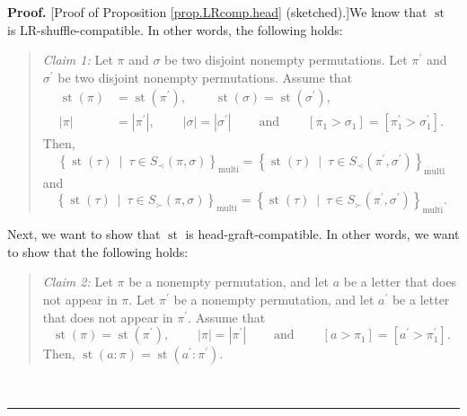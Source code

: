 \documentclass[numbers=enddot,12pt,final,onecolumn,notitlepage]{scrartcl}%
\theoremstyle{definition}
\newenvironment{statement}{\begin{quote}}{\end{quote}}
\newenvironment{proof}[1][Proof]{\noindent\textbf{#1.} }{\ \rule{0.5em}{0.5em}}
\begin{document}
\begin{proof}
[Proof of Proposition \ref{prop.LRcomp.head} (sketched).]We know that
$\operatorname*{st}$ is LR-shuffle-compatible. In other words, the following holds:

\begin{statement}
\textit{Claim 1:} Let $\pi$ and $\sigma$ be two disjoint nonempty
permutations. Let $\pi^{\prime}$ and $\sigma^{\prime}$ be two disjoint
nonempty permutations. Assume that%
\begin{align*}
\operatorname*{st}\left(  \pi\right)   &  =\operatorname*{st}\left(
\pi^{\prime}\right)  ,\ \ \ \ \ \ \ \ \ \ \operatorname*{st}\left(
\sigma\right)  =\operatorname*{st}\left(  \sigma^{\prime}\right)  ,\\
\left\vert \pi\right\vert  &  =\left\vert \pi^{\prime}\right\vert
,\ \ \ \ \ \ \ \ \ \ \left\vert \sigma\right\vert =\left\vert \sigma^{\prime
}\right\vert \ \ \ \ \ \ \ \ \ \ \text{and}\ \ \ \ \ \ \ \ \ \ \left[  \pi
_{1}>\sigma_{1}\right]  =\left[  \pi_{1}^{\prime}>\sigma_{1}^{\prime}\right]
.
\end{align*}
Then,
\[
\left\{  \operatorname*{st}\left(  \tau\right)  \ \mid\ \tau\in S_{\prec
}\left(  \pi,\sigma\right)  \right\}  _{\operatorname*{multi}}=\left\{
\operatorname*{st}\left(  \tau\right)  \ \mid\ \tau\in S_{\prec}\left(
\pi^{\prime},\sigma^{\prime}\right)  \right\}  _{\operatorname*{multi}}%
\]
and%
\[
\left\{  \operatorname*{st}\left(  \tau\right)  \ \mid\ \tau\in S_{\succ
}\left(  \pi,\sigma\right)  \right\}  _{\operatorname*{multi}}=\left\{
\operatorname*{st}\left(  \tau\right)  \ \mid\ \tau\in S_{\succ}\left(
\pi^{\prime},\sigma^{\prime}\right)  \right\}  _{\operatorname*{multi}}.
\]

\end{statement}

Next, we want to show that $\operatorname*{st}$ is head-graft-compatible. In
other words, we want to show that the following holds:

\begin{statement}
\textit{Claim 2:} Let $\pi$ be a nonempty permutation, and let $a$ be a letter
that does not appear in $\pi$. Let $\pi^{\prime}$ be a nonempty permutation,
and let $a^{\prime}$ be a letter that does not appear in $\pi^{\prime}$.
Assume that%
\[
\operatorname*{st}\left(  \pi\right)  =\operatorname*{st}\left(  \pi^{\prime
}\right)  ,\ \ \ \ \ \ \ \ \ \ \left\vert \pi\right\vert =\left\vert
\pi^{\prime}\right\vert \ \ \ \ \ \ \ \ \ \ \text{and}%
\ \ \ \ \ \ \ \ \ \ \left[  a>\pi_{1}\right]  =\left[  a^{\prime}>\pi
_{1}^{\prime}\right]  .
\]
Then, $\operatorname*{st}\left(  a:\pi\right)  =\operatorname*{st}\left(
a^{\prime}:\pi^{\prime}\right)  $.
\end{statement}


\end{proof}
\end{document}
